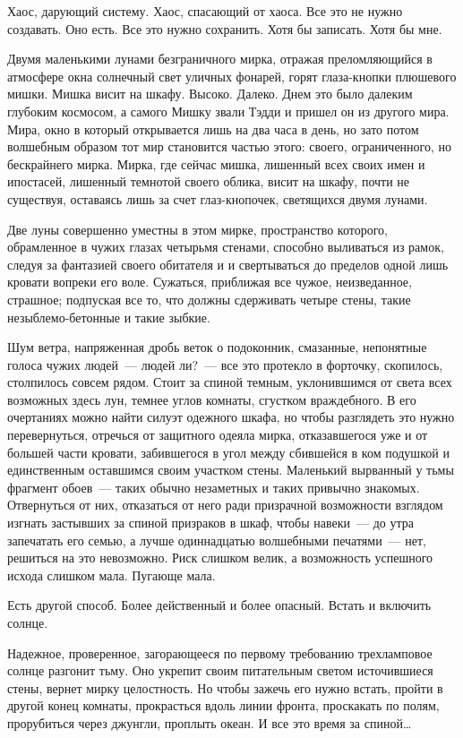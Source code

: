 Хаос, дарующий систему. Хаос, спасающий от хаоса. Все это не нужно создавать. 
Оно есть. Все это нужно сохранить. Хотя бы записать. Хотя бы мне.

Двумя маленькими лунами безграничного мирка, отражая преломляющийся в атмосфере 
окна солнечный свет уличных фонарей, горят глаза-кнопки плюшевого мишки. Мишка 
висит на шкафу. Высоко. Далеко.  Днем это было далеким глубоким космосом, а 
самого Мишку звали Тэдди и пришел он из другого мира. Мира, окно в который 
открывается лишь на два часа в день, но зато потом волшебным образом тот мир 
становится частью этого: своего, ограниченного, но бескрайнего мирка.  Мирка, 
где сейчас мишка, лишенный всех своих имен и ипостасей, лишенный темнотой 
своего облика, висит на шкафу, почти не существуя, оставаясь лишь за счет 
глаз-кнопочек, светящихся двумя лунами.

Две луны совершенно уместны в этом мирке, пространство которого, обрамленное в 
чужих глазах четырьмя стенами, способно выливаться из рамок, следуя за 
фантазией своего обитателя и и свертываться до пределов одной лишь кровати вопреки его 
воле. Сужаться, приближая все чужое, неизведанное, страшное; подпуская все то, 
что должны сдерживать четыре стены, такие незыблемо-бетонные и такие зыбкие.

Шум ветра, напряженная дробь веток о подоконник, смазанные, непонятные голоса 
чужих людей~--- людей ли?~--- все это протекло в форточку, скопилось, 
столпилось совсем рядом. Стоит за спиной темным, уклонившимся от света всех возможных 
здесь лун, темнее углов комнаты, сгустком враждебного. В его очертаниях можно найти 
силуэт одежного шкафа, но чтобы разглядеть это нужно перевернуться, отречься от 
защитного одеяла  мирка, отказавшегося уже и от большей  части кровати, 
забившегося в угол между сбившейся в ком  подушкой и единственным оставшимся 
своим участком стены. Маленький вырванный у тьмы фрагмент обоев~--- таких 
обычно незаметных и таких привычно знакомых. Отвернуться от них, отказаться от него 
ради призрачной возможности взглядом изгнать застывших за спиной призраков в 
шкаф, чтобы навеки~--- до утра запечатать его семью, а лучше одиннадцатью 
волшебными печатями~--- нет, решиться на это невозможно. Риск слишком велик, а 
возможность успешного исхода слишком мала. Пугающе мала.

Есть другой способ. Более действенный и более опасный. Встать и включить 
солнце. 

Надежное, проверенное, загорающееся по первому требованию трехламповое солнце 
разгонит тьму. Оно укрепит своим питательным светом источившиеся стены, вернет 
мирку целостность. Но чтобы зажечь его нужно встать, пройти в другой конец 
комнаты, прокрасться вдоль линии фронта, проскакать по  полям, прорубиться 
через джунгли, проплыть океан. И все это время за спиной\ldots

